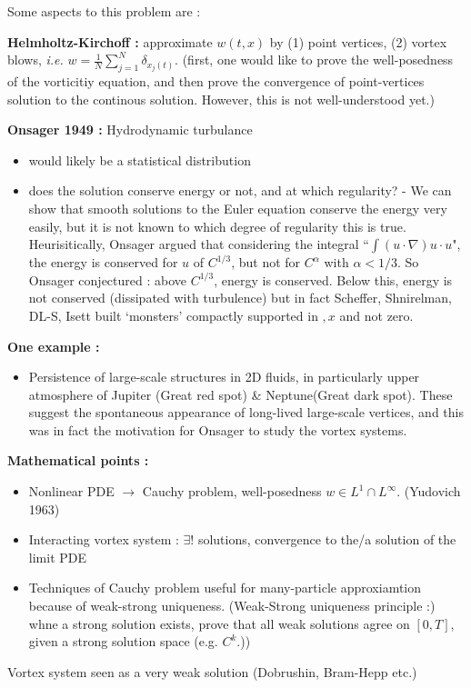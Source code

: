 \documentclass[12pt,a4paper]{extarticle}
\begin{document}
Some aspects to this problem are :
\s

\textbf{Helmholtz-Kirchoff :} approximate $w(t,x)$ by (1) point vertices, (2) vortex blows, \textit{i.e.} $w= \frac{1}{N}\sum_{j=1}^N \delta_{x_j(t)}$. (first, one would like to prove the well-posedness of the vorticitiy equation, and then prove the convergence of point-vertices solution to the continous solution. However, this is not well-understood yet.)
\s

\textbf{Onsager 1949 :} Hydrodynamic turbulance
\begin{itemize}
\item would likely be a statistical distribution
\item does the solution conserve energy or not, and at which regularity? - We can show that smooth solutions to the Euler equation conserve the energy very easily, but it is not known to which degree of regularity this is true. Heurisitically, Onsager argued that considering the integral ``$\int (u\cdot \nabla)u \cdot u$", the energy is conserved for $u$ of $C^{1/3}$, but not for $C^{\alpha}$ with $\alpha < 1/3$. So Onsager conjectured : above $C^{1/3}$, energy is conserved. Below this, energy is not conserved (dissipated with turbulence) but in fact Scheffer, Shnirelman, DL-S, Isett built `monsters' compactly supported in $,x$ and not zero. 
\end{itemize}
\s

\textbf{One example :}
\begin{itemize}
\item Persistence of large-scale structures in 2D fluids, in particularly upper atmosphere of Jupiter (Great red spot) \& Neptune(Great dark spot). These suggest the spontaneous appearance of long-lived large-scale vertices, and this was in fact the motivation for Onsager to study the vortex systems.
\end{itemize}
\s

\textbf{Mathematical points :}
\begin{itemize}
\item Nonlinear PDE $\rightarrow$ Cauchy problem, well-posedness $w\in L^1 \cap L^{\infty}$. (Yudovich 1963)
\item Interacting vortex system : $\exists !$ solutions, convergence to the/a solution of the limit PDE
\item Techniques of Cauchy problem useful for many-particle approxiamtion because of weak-strong uniqueness. (Weak-Strong uniqueness principle :) whne a strong solution exists, prove that all weak solutions agree on $[0, T]$, given a strong solution space (e.g. $C^k$.))
\end{itemize}
Vortex system seen as a very weak solution (Dobrushin, Bram-Hepp etc.)
\s
\end{document}
